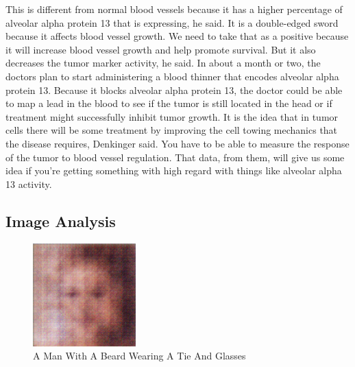 \documentclass{article}%
\begin{document}
This is different from normal blood vessels because it has a higher percentage of alveolar alpha protein 13 that is expressing, he said. It is a double{-}edged sword because it affects blood vessel growth. We need to take that as a positive because it will increase blood vessel growth and help promote survival. But it also decreases the tumor marker activity, he said.\newline%
In about a month or two, the doctors plan to start administering a blood thinner that encodes alveolar alpha protein 13. Because it blocks alveolar alpha protein 13, the doctor could be able to map a lead in the blood to see if the tumor is still located in the head or if treatment might successfully inhibit tumor growth.\newline%
It is the idea that in tumor cells there will be some treatment by improving the cell towing mechanics that the disease requires, Denkinger said. You have to be able to measure the response of the tumor to blood vessel regulation. That data, from them, will give us some idea if you're getting something with high regard with things like alveolar alpha 13 activity.

%
\subsection{Image Analysis}%
\label{subsec:ImageAnalysis}%


\begin{figure}[h!]%
\centering%
\includegraphics[width=150px]{500_fake_images/samples_5_319.png}%
\caption{A Man With A Beard Wearing A Tie And Glasses}%
\end{figure}

%
\end{document}
